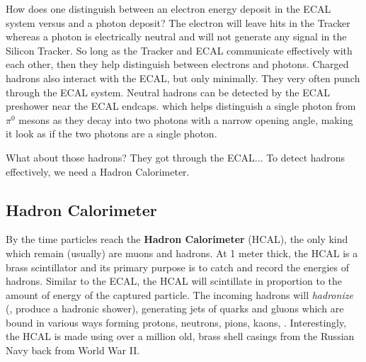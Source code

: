 How does one distinguish between an electron energy deposit in the ECAL system versus and a photon deposit?
The electron will leave hits in the Tracker whereas a photon is electrically neutral and will not generate any signal in the Silicon Tracker. 
So long as the Tracker and ECAL communicate effectively with each other, then they help distinguish between electrons and photons.
Charged hadrons also interact with the ECAL, but only minimally. They very often punch through the ECAL system.
Neutral hadrons can be detected by the ECAL preshower near the ECAL endcaps. 
which helps distinguish a single photon from $\pi^{0}$ mesons as they decay into two photons with a narrow opening angle, making it look as if the two photons are a single photon.

What about those hadrons? They got through the ECAL... To detect hadrons effectively, we need a Hadron Calorimeter.

\subsection{Hadron Calorimeter}
By the time particles reach the {\bf Hadron Calorimeter} (HCAL), the only kind which remain (usually) are muons and hadrons.
At 1 meter thick, the HCAL is a brass scintillator and its primary purpose is to catch and record the energies of hadrons.
Similar to the ECAL, the HCAL will scintillate in proportion to the amount of energy of the captured particle. 
The incoming hadrons will \emph{hadronize} (\ie, produce a hadronic shower), generating jets of quarks and gluons which are bound in various ways forming protons, neutrons, pions, kaons, \etc.
Interestingly, the HCAL is made using over a million old, brass shell casings from the Russian Navy back from World War II.

